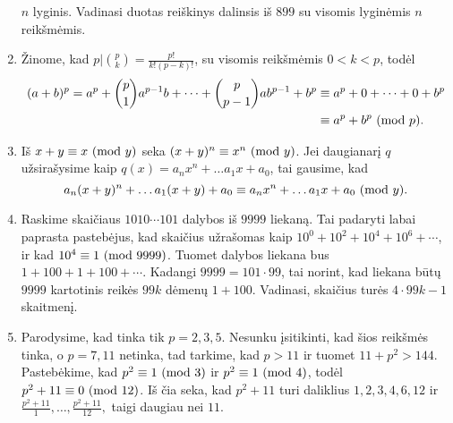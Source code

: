 \begin{enumerate}
$n$ lyginis. Vadinasi duotas reiškinys dalinsis iš $899$ su visomis
lyginėmis $n$ reikšmėmis.
\item 
Žinome, kad $p|\binom{p}{k} = \frac{p!}{k!(p-k)!}$, su visomis
reikšmėmis $0<k<p$, todėl 
\begin{align*}
(a+b)^p = a^p + \binom{p}{1}a^{p-1}b + \cdots + \binom{p}{p-1}ab^{p-1}
+ b^p & \equiv a^p + 0 + \cdots + 0 + b^p \\ 
      & \equiv a^p + b^p \ (\text{mod } p). 
\end{align*}
\item 
Iš $x+y \equiv x \ (\text{mod } y)$ seka $(x+y)^n \equiv x^n \ (\text{mod } y)$. Jei
daugianarį $q$ užsirašysime kaip $q(x) = a_nx^n + \dots a_1x + a_0$,
tai gausime, kad $$a_n(x+y)^n + \dots a_1(x+y) + a_0 \equiv a_nx^n +
\dots a_1x + a_0 \ (\text{mod } y).$$
\item 
Raskime skaičiaus $1010\cdots101$ dalybos iš $9999$ liekaną. Tai
padaryti labai paprasta pastebėjus, kad skaičius užrašomas kaip $10^0 +
10^2 + 10^4 + 10^6 + \cdots $, ir kad $10^4 \equiv 1 \ (\text{mod } 9999)$. Tuomet
dalybos liekana bus $1 + 100 + 1 + 100 + \cdots$.  Kadangi $9999=101
\cdot 99$, tai norint, kad liekana būtų $9999$ kartotinis reikės
$99k$ dėmenų $1 + 100$. Vadinasi, skaičius turės $4\cdot 99k - 1$
skaitmenį.
\item 
Parodysime, kad tinka tik $p=2,3,5$. Nesunku įsitikinti, kad šios
reikšmės tinka, o $p = 7,11$ netinka, tad tarkime, kad $p>11$ ir tuomet
$11 + p^2> 144.$ Pastebėkime, kad $p^2 \equiv 1 \ (\text{mod } 3)$ ir $p^2 \equiv 1
\ (\text{mod } 4)$, todėl $p^2 + 11 \equiv 0 \ (\text{mod } 12)$. Iš čia seka, kad $p^2 + 11$
turi daliklius $1, 2, 3, 4, 6, 12$ ir $\frac{p^2 + 11}{1}, \dots,
\frac{p^2 + 11}{12},$ taigi daugiau nei $11$.
\end{enumerate} 
